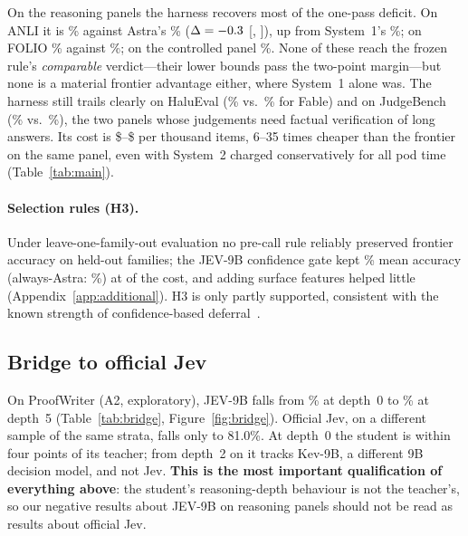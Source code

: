 On the reasoning panels the harness recovers most of the one-pass deficit.
On ANLI it is \AccAnliHarn\% against Astra's \AccAnliAstra\% ($\Delta=-0.3$ [\LoHAnliAstra, \HiHAnliAstra]), up from System~1's \AccAnliSone\%; on FOLIO \AccFolioHarn\% against \AccFolioAstra\%; on the controlled panel \AccCtlHarn\%.
None of these reach the frozen rule's \emph{comparable} verdict---their lower bounds pass the two-point margin---but none is a material frontier advantage either, where System~1 alone was.
The harness still trails clearly on HaluEval (\AccHaluHarn\% vs.\ \AccHaluFable\% for Fable) and on JudgeBench (\AccJbgptHarn\% vs.\ \AccJbgptAstra\%), the two panels whose judgements need factual verification of long answers.
Its cost is \$\CostFolioHarn--\$\CostJbgptHarn{} per thousand items, 6--35 times cheaper than the frontier on the same panel, even with System~2 charged conservatively for all pod time (Table~\ref{tab:main}).




\ifsubmission
\paragraph{Selection rules (H3).} Under leave-one-family-out evaluation no pre-call rule reliably preserved frontier accuracy on held-out families; the JEV-9B confidence gate kept \RouteAstraGateAcc\% mean accuracy (always-Astra: \RouteAstraAfrAcc\%) at \RouteAstraGateCost{} of the cost, and adding surface features helped little (Appendix~\ref{app:additional}). H3 is only partly supported, consistent with the known strength of confidence-based deferral~\citep{cascadedeferral2023}.
\fi

\subsection{Bridge to official Jev}
\label{sec:bridge}
On ProofWriter (A2, exploratory), JEV-9B falls from \BridgeDZero\% at depth~0 to \BridgeDFive\% at depth~5 (Table~\ref{tab:bridge}, Figure~\ref{fig:bridge}).
Official Jev, on a different sample of the same strata, falls only to 81.0\%.
At depth~0 the student is within four points of its teacher; from depth~2 on it tracks Kev-9B, a different 9B decision model, and not Jev.
\textbf{This is the most important qualification of everything above}: the student's reasoning-depth behaviour is not the teacher's, so our negative results about JEV-9B on reasoning panels should not be read as results about official Jev.
